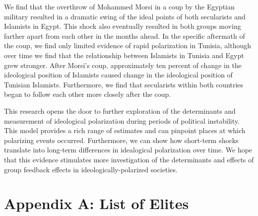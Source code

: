 \documentclass[12pt]{article}
\begin{document}
We find that the overthrow of Mohammed Morsi in a coup by the Egyptian military resulted in a dramatic swing of the ideal points of both secularists and Islamists in Egypt. This shock also eventually resulted in both groups moving farther apart from each other in the months ahead. In the specific aftermath of the coup, we find only limited evidence of rapid polarization in Tunisia, although over time we find that the relationship between Islamists in Tunisia and Egypt grew stronger. After Morsi's coup, approximately ten percent of change in the ideological position of Islamists caused change in the ideological position of Tunisian Islamists. Furthermore, we find that secularists within both countries began to follow each other more closely after the coup.

This research opens the door to further exploration of the determinants and measurement of ideological polarization during periods of political instability. This model provides a rich range of estimates and can pinpoint places at which polarizing events occurred. Furthermore, we can show how short-term shocks translate into long-term differences in idealogical polarization over time. We hope that this evidence stimulates more investigation of the determinants and effects of group feedback effects in ideologically-polarized societies.

\section*{Appendix A: List of Elites}
\end{document}

